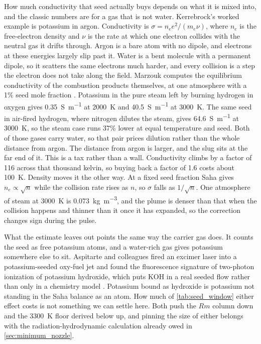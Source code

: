 \documentclass{article}
\begin{document}
How much conductivity that seed actually buys depends on what it is mixed into, and the classic numbers are for a gas that is not water. Kerrebrock's worked example is potassium in argon. Conductivity is $\sigma = n_e e^2 / (m_e \nu)$, where $n_e$ is the free-electron density and $\nu$ is the rate at which one electron collides with the neutral gas it drifts through. Argon is a bare atom with no dipole, and electrons at these energies largely slip past it. Water is a bent molecule with a permanent dipole, so it scatters the same electrons much harder, and every collision is a step the electron does not take along the field. Marzouk computes the equilibrium conductivity of the combustion products themselves, at one atmosphere with a 1\% seed mole fraction \cite{marzouk2024conductivity}. Potassium in the pure steam left by burning hydrogen in oxygen gives \SI{0.35}{\siemens\per\meter} at \SI{2000}{\kelvin} and \SI{40.5}{\siemens\per\meter} at \SI{3000}{\kelvin}. The same seed in air-fired hydrogen, where nitrogen dilutes the steam, gives \SI{64.6}{\siemens\per\meter} at \SI{3000}{\kelvin}, so the steam case runs 37\% lower at equal temperature and seed. Both of those gases carry water, so that pair prices dilution rather than the whole distance from argon. The distance from argon is larger, and the slug sits at the far end of it. This is a tax rather than a wall. Conductivity climbs by a factor of 116 across that thousand kelvin, so buying back a factor of 1.6 costs about \SI{100}{\kelvin}. Density moves it the other way. At a fixed seed fraction Saha gives $n_e \propto \sqrt{n}$ while the collision rate rises as $n$, so $\sigma$ falls as $1/\sqrt{n}$. One atmosphere of steam at \SI{3000}{\kelvin} is \SI{0.073}{\kilogram\per\cubic\meter}, and the plume is denser than that when the collision happens and thinner than it once it has expanded, so the correction changes sign during the pulse.

What the estimate leaves out points the same way the carrier gas does. It counts the seed as free potassium atoms, and a water-rich gas gives potassium somewhere else to sit. Aspitarte and colleagues fired an excimer laser into a potassium-seeded oxy-fuel jet and found the fluorescence signature of two-photon ionization of potassium hydroxide, which puts KOH in a real seeded flow rather than only in a chemistry model \cite{aspitarte2025photoionization}. Potassium bound as hydroxide is potassium not standing in the Saha balance as an atom. How much of \autoref{tab:seed_window} either effect costs is not something we can settle here. Both push the $Rm$ column down and the \SI{3300}{\kelvin} floor derived below up, and pinning the size of either belongs with the radiation-hydrodynamic calculation already owed in \autoref{sec:minimum_nozzle}.
\end{document}
